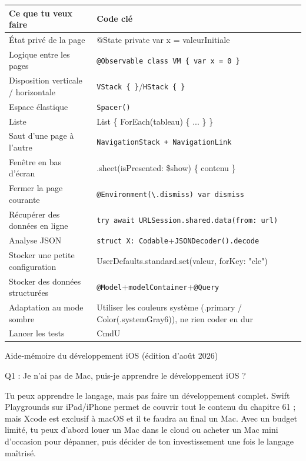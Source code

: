 


\begin{center}
\begin{tabularx}{\linewidth}{|X|X|}
\hline
\textbf{Ce que tu veux faire} & \textbf{Code clé} \tabularnewline
\hline
État privé de la page & @State private var x = valeurInitiale \tabularnewline
Logique entre les pages & \texttt{@Observable class VM \{ var x = 0 \}} \tabularnewline
Disposition verticale / horizontale & \texttt{VStack \{ \}}/\texttt{HStack \{ \}} \tabularnewline
Espace élastique & \texttt{Spacer()} \tabularnewline
Liste & List \{ ForEach(tableau) \{ ... \} \} \tabularnewline
Saut d'une page à l'autre & \texttt{NavigationStack + NavigationLink} \tabularnewline
Fenêtre en bas d'écran & .sheet(isPresented: \$show) \{ contenu \} \tabularnewline
Fermer la page courante & \texttt{@Environment(\textbackslash{}.\allowbreak dismiss) var dismiss} \tabularnewline
Récupérer des données en ligne & \texttt{try await URLSession.\allowbreak shared.\allowbreak data(from: url)} \tabularnewline
Analyse JSON & \texttt{struct X: Codable}+\texttt{JSONDecoder().\allowbreak decode} \tabularnewline
Stocker une petite configuration & UserDefaults.standard.set(valeur, forKey: "cle") \tabularnewline
Stocker des données structurées & \texttt{@Model}+\texttt{modelContainer}+\texttt{@Query} \tabularnewline
Adaptation au mode sombre & Utiliser les couleurs système (.primary / Color(.systemGray6)), ne rien coder en dur \tabularnewline
Lancer les tests & CmdU \tabularnewline
\hline
\end{tabularx}
\end{center}

\begin{center}\small\color{gray}Aide-mémoire du développement iOS (édition d'août 2026)\end{center}


Q1 : Je n'ai pas de Mac, puis-je apprendre le développement iOS ?

Tu peux apprendre le langage, mais pas faire un développement complet. Swift Playgrounds sur iPad/iPhone permet de couvrir tout le contenu du chapitre 61 ; mais Xcode est exclusif à macOS et il te faudra au final un Mac. Avec un budget limité, tu peux d'abord louer un Mac dans le cloud ou acheter un Mac mini d'occasion pour dépanner, puis décider de ton investissement une fois le langage maîtrisé.

